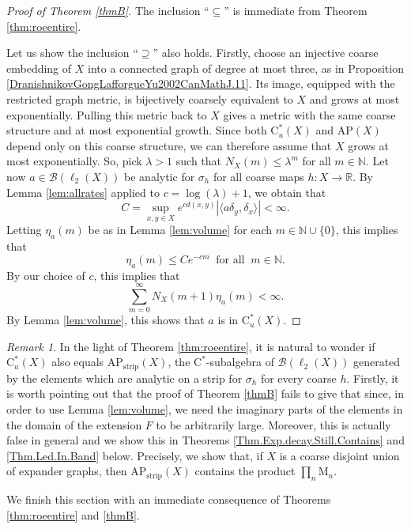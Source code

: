 \documentclass[11pt]{amsart}
\newcommand{\R}{\mathbb{R}}
\newcommand{\N}{\mathbb{N}}
\newcommand{\cB}{\mathcal{B}}
\newcommand{\cstu}{\mathrm{C}^*_u}
\newcommand{\cstar}{$\mathrm{C}^*$}
\numberwithin{equation}{section}
\theoremstyle{definition}
\theoremstyle{remark}
\newtheorem{remark}[theorem]{Remark}
\begin{document}
\begin{proof}[Proof of Theorem \ref{thmB}]
The inclusion ``$\subseteq$''  is immediate from Theorem \ref{thm:roeentire}.


 Let us show the inclusion ``$\supseteq$''  also holds. Firstly, choose an injective coarse embedding of $X$ into a connected graph of degree at most three, as in Proposition \ref{DranishnikovGongLafforgueYu2002CanMathJ.11}. Its image, equipped with the restricted graph metric, is bijectively coarsely equivalent to $X$ and grows at most exponentially. Pulling this metric back to $X$ gives a metric with the same coarse structure and at most exponential growth. Since both $\cstu(X)$ and $\mathrm{AP}(X)$ depend only on this coarse structure, we can therefore assume that $X$ grows at most exponentially. So, pick $\lambda>1$ such that $N_X(m)\leq \lambda^m$ for all $m\in\N$. Let now $a\in \cB(\ell_2(X))$ be analytic for $\sigma_h$ for all coarse maps $h\colon X\to \R$. By Lemma \ref{lem:allrates} applied to $c=\log(\lambda)+1$, we obtain that
 \[C=\sup_{x,y\in X}e^{cd(x,y)}{|\langle a\delta_y,\delta_x\rangle|}<\infty.\]
Letting $\eta_a(m)$ be as in Lemma \ref{lem:volume}  for each $m\in\N\cup\{0\}$, this implies that  \[\eta_a(m)\leq Ce^{-cm}\ \text{ for all }\ m\in\N.\]
By our choice of $c$, this implies that
\[\sum_{m=0}^\infty N_X(m+1)\eta_a(m)<\infty.\]
By  Lemma \ref{lem:volume}, this shows that $a$ is in $\cstu(X)$.
\end{proof}

\begin{remark}  In the light of Theorem \ref{thm:roeentire}, it is natural to wonder if $\cstu(X)$ also equals $\mathrm{AP}_{\mathrm{strip}}(X)$,     the \cstar-subalgebra of $\cB(\ell_2(X))$ generated by the elements which are analytic on a strip for $\sigma_h$ for every coarse $h$.   Firstly, it is worth pointing out that the proof of Theorem \ref{thmB} fails to give that since, in order to use  Lemma \ref{lem:volume}, we need the
 imaginary parts of the elements in the domain of the extension $F$ to be arbitrarily large. Moreover, this is actually false in general and we show this in Theorems \ref{Thm.Exp.decay.Still.Contains} and \ref{Thm.Led.In.Band} below. Precisely, we show that, if $X$ is a coarse disjoint union of expander graphs, then $\mathrm{AP}_{\mathrm{strip}}(X)$ contains the product $\prod_n\mathrm M_n$.
\end{remark}

We finish this section with an immediate consequence of Theorems \ref{thm:roeentire} and \ref{thmB}.
 
\end{document}
